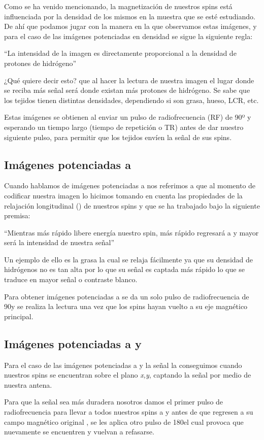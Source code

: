 Como se ha venido mencionando, la magnetización de nuestros spins está influenciada por la densidad de los mismos en la muestra que se esté estudiando. De ahí que podamos jugar con la manera en la que observamos estas imágenes, y para el caso de las imágenes potenciadas en densidad se sigue la siguiente regla:

``La intensidad de la imagen es directamente proporcional a la densidad de protones de hidrógeno''

¿Qué quiere decir esto? que al hacer la lectura de nuestra imagen el lugar donde se reciba más señal será donde existan más protones de hidrógeno. Se sabe que los tejidos tienen distintas densidades, dependiendo si son grasa, hueso, LCR, etc.


Estas imágenes se obtienen al enviar un pulso de radiofrecuencia (RF) de 90º  y esperando un tiempo largo (tiempo de repetición o TR) antes de dar nuestro siguiente pulso, para permitir que los tejidos envíen la señal de sus spins.


\subsection{Imágenes potenciadas a \Tone}

Cuando hablamos de imágenes potenciadas a \Tone nos referimos a que al momento de codificar nuestra imagen lo hicimos tomando en cuenta las propiedades de la relajación longitudinal (\Tone) de nuestros spins y que se ha trabajado bajo la siguiente premisa:

``Mientras más rápido libere energía nuestro spin, más rápido regresará a \Mz  y mayor será la intensidad de nuestra señal''

Un ejemplo de ello es la grasa la cual  se relaja fácilmente ya que su densidad de hidrógenos no es tan alta por lo que su señal es captada más rápido lo que se traduce en mayor señal o contraste blanco.


Para obtener imágenes potenciadas a \Tone se da un solo pulso de radiofrecuencia de 90\degrees y se realiza la lectura una vez que los spins hayan vuelto a su eje magnético principal.


\subsection{Imágenes potenciadas a \Ttwo y \Ttwostar}

Para el caso de las imágenes potenciadas a \Ttwo y \Ttwostar la señal la conseguimos cuando nuestros spins se encuentran sobre el plano \textit{x,y}, captando la señal por medio de nuestra antena. 

Para que la señal sea más duradera nosotros damos el primer pulso de radiofrecuencia para llevar a todos nuestros spins a \Mx  y antes de que regresen a su campo magnético original , se les aplica otro pulso de 180\degrees  el cual provoca que nuevamente se encuentren y vuelvan a refasarse.




